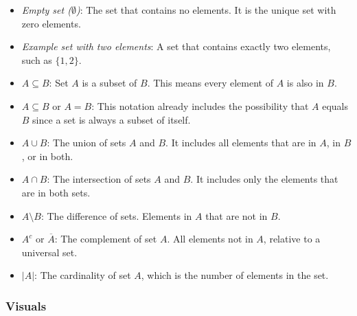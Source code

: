 \begin{itemize}[label=\(-\)]
	\item \emph{Empty set (\(\emptyset\))}: The set that contains no elements. It is the unique set with zero elements.

	\item \emph{Example set with two elements}: A set that contains exactly two elements, such as \(\{1, 2\}\).

	\item \(A \subseteq B\): Set \(A\) is a subset of \(B\). This means every element of \(A\) is also in \(B\).

	\item \(A \subseteq B\) or \(A = B\): This notation already includes the possibility that \(A\) equals \(B\) since a set is always a subset of itself.

	\item \(A \cup B\): The union of sets \(A\) and \(B\). It includes all elements that are in \(A\), in \(B\), or in both.

	\item \(A \cap B\): The intersection of sets \(A\) and \(B\). It includes only the elements that are in both sets.

	\item \(A \setminus B\): The difference of sets. Elements in \(A\) that are not in \(B\).

	\item \(A^c\) or \(\overline{A}\): The complement of set \(A\). All elements not in \(A\), relative to a universal set.

	\item \(|A|\): The cardinality of set \(A\), which is the number of elements in the set.
\end{itemize}

\smallskip
\subsubsection{Visuals}

